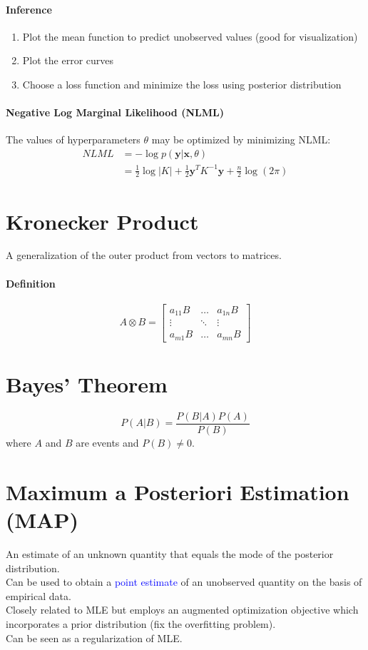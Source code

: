 \documentclass[11pt]{article}
\newcommand{\tb}[1]{\textbf{#1}}
\newcommand{\vx}[0]{\tb{x}}
\newcommand{\vy}[0]{\tb{y}}
\begin{document}
\paragraph{Inference}
\begin{enumerate}
	\item Plot the mean function to predict unobserved values (good for visualization)
	\item Plot the error curves
	\item Choose a loss function and minimize the loss using posterior distribution
\end{enumerate}
\paragraph{Negative Log Marginal Likelihood (NLML)}
The values of hyperparameters $\theta$ may be optimized by minimizing NLML:
\begin{align*}
	NLML &= -\log p(\vy|\vx,\theta) \\
	&= \frac{1}{2}\log |K| + \frac{1}{2}\vy^TK^{-1}\vy + \frac{n}{2} \log (2\pi)
\end{align*}
\section{Kronecker Product}
A generalization of the outer product from vectors to matrices.
\paragraph{Definition}
$$A \otimes B = \begin{bmatrix}
	a_{11}B & \hdots & a_{1n}B \\
	\vdots & \ddots & \vdots \\
	a_{m1}B & \hdots & a_{mn}B
\end{bmatrix}$$
\section{Bayes' Theorem}
$$P(A|B) = \frac{P(B|A)P(A)}{P(B)}$$
where $A$ and $B$ are events and $P(B) \neq 0$.
\section{Maximum a Posteriori Estimation (MAP)}
An estimate of an unknown quantity that equals the mode of the posterior distribution. \\
Can be used to obtain a \textcolor{blue}{point estimate} of an unobserved quantity on the basis of empirical data.\\
Closely related to MLE but employs an augmented optimization objective which incorporates a prior distribution (fix the overfitting problem). \\
Can be seen as a regularization of MLE.
\end{document}

